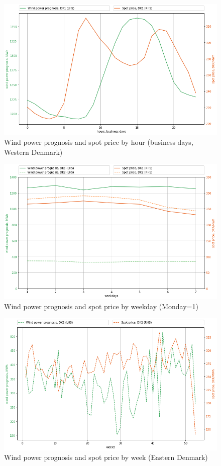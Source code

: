 \begin{figure}[H]
  \centering
  \caption{Wind power prognosis and spot price by hour (business days, Western Denmark)}
  \label{fig:wp_dk1_hours}
    \includegraphics[width=1 \textwidth]{03_figures/wp_DK1_hours, business days}
\end{figure}

\begin{figure}[H]
  \centering
  \caption{Wind power prognosis and spot price by weekday (Monday=1)}
  \label{fig:wp_price_weekday}
    \includegraphics[width=1 \textwidth]{03_figures/wp_weekdays}
\end{figure}

\begin{figure}[H]
  \centering
  \caption{Wind power prognosis and spot price by week (Eastern Denmark)}
  \label{fig:wp_price_dk2_week}
    \includegraphics[width=1 \textwidth]{03_figures/wp_DK2_weeks}
\end{figure}
